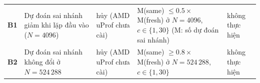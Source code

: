 \begin{longtable}{l>{\raggedright\arraybackslash}p{3.2cm}>{\raggedright\arraybackslash}p{4.2cm}>{\raggedright\arraybackslash}p{4.3cm}>{\raggedright\arraybackslash}p{1.8cm}}
\textbf{B1} & Dự đoán sai nhánh giảm khi lặp đầu vào ($N=4096$) & hủy (AMD uProf chưa cài) & M(same) $\le0.5\times$ M(fresh) ở $N=4096$, $c\in\{1,30\}$ (M: số dự đoán sai nhánh) & không thực hiện \\
\textbf{B2} & Dự đoán sai nhánh không đổi ở $N=524\,288$ & hủy (AMD uProf chưa cài) & M(same) $\ge0.8\times$ M(fresh) ở $N=524\,288$, $c\in\{1,30\}$ & không thực hiện \\
\end{longtable}
